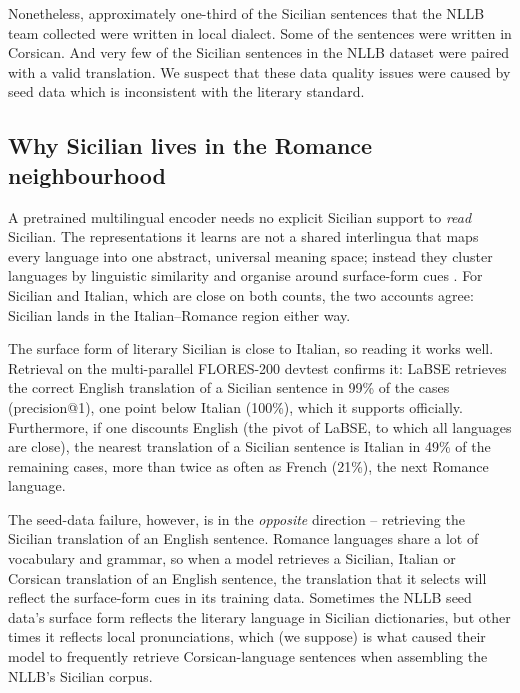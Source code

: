 \documentclass[11pt,a4paper]{article}
\begin{document}
Nonetheless,
approximately one-third of the Sicilian sentences
that the NLLB team collected were written in local dialect.
Some of the sentences were written in Corsican.
And very few of the Sicilian sentences in the NLLB dataset
were paired with a valid translation.
We suspect that these data quality issues were caused
by seed data which is inconsistent with the literary standard.



\subsection{Why Sicilian lives in the Romance neighbourhood}
\label{sec:dataquality}
A pretrained multilingual encoder needs no explicit Sicilian support to \emph{read} Sicilian.
The representations it learns are not a shared interlingua that maps every language into one
abstract, universal meaning space; instead they cluster languages by linguistic similarity
\citep{kudugunta2019investigating} and organise around surface-form cues \citep{verma2026script}.
For Sicilian and Italian, which are close on both counts, the two accounts agree: Sicilian lands
in the Italian--Romance region either way.

The surface form of literary Sicilian is close to Italian, so reading it works well.
Retrieval on the multi-parallel FLORES-200 devtest \citep{nllb2022} confirms it: LaBSE
retrieves the correct English translation of a Sicilian sentence in 99\% of the cases
(precision@1), one point below Italian (100\%), which it supports officially. Furthermore, if one
discounts English (the pivot of LaBSE, to which all languages are close), the nearest
translation of a Sicilian sentence is Italian in 49\% of the remaining cases, more than twice as often as
French (21\%), the next Romance language.

The seed-data failure, however, is in the \emph{opposite} direction -- retrieving
the Sicilian translation of an English sentence.
Romance languages share a lot of vocabulary and grammar, so when a model
retrieves a Sicilian, Italian or Corsican translation of an English sentence,
the translation that it selects will reflect the surface-form cues in its training data.
Sometimes the NLLB seed data's surface form reflects the literary language in
Sicilian dictionaries, but other times it reflects local pronunciations, which
(we suppose) is what caused their model to frequently retrieve Corsican-language sentences
when assembling the NLLB's Sicilian corpus.
\end{document}
